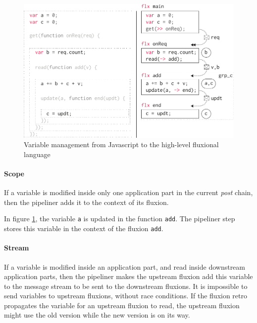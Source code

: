 \begin{figure}[h!]
\begin{center}
  \includegraphics[width=\linewidth]{resources/states.pdf}
  \caption{Variable management from Javascript to the high-level fluxional language}
  \label{fig:states}
\end{center}
\end{figure}

\paragraph{Scope}
If a variable is modified inside only one application part in the current \textit{post} chain, then the pipeliner adds it to the context of its fluxion.

In figure \ref{fig:states}, the variable \texttt{a} is updated in the function \texttt{add}.
The pipeliner step stores this variable in the context of the fluxion \texttt{add}.

\paragraph{Stream}
If a variable is modified inside an application part, and read inside downstream application parts, then the pipeliner makes the upstream fluxion add this variable to the message stream to be sent to the downstream fluxions.
It is impossible to send variables to upstream flux\-ions, without race conditions.
If the fluxion retro propagates the variable for an upstream fluxion to read, the upstream fluxion might use the old version while the new version is on its way.

